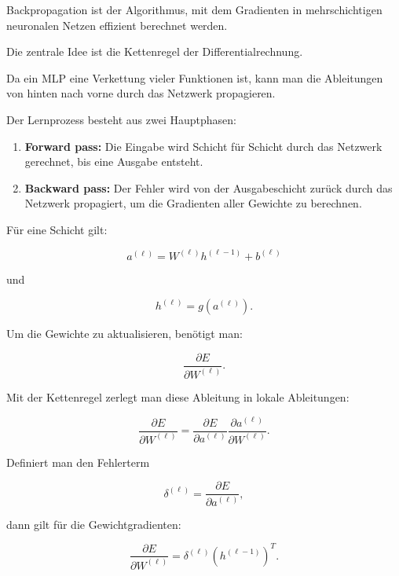 \documentclass[11pt,a4paper]{scrartcl}
\begin{document}
\begin{notebox}
    Backpropagation ist der Algorithmus, mit dem Gradienten in mehrschichtigen
    neuronalen Netzen effizient berechnet werden.

    Die zentrale Idee ist die Kettenregel der Differentialrechnung.

    Da ein MLP eine Verkettung vieler Funktionen ist, kann man die Ableitungen
    von hinten nach vorne durch das Netzwerk propagieren.
\end{notebox}

\begin{solutionbox}
    Der Lernprozess besteht aus zwei Hauptphasen:

    \begin{enumerate}
        \item \textbf{Forward pass:}
        Die Eingabe wird Schicht für Schicht durch das Netzwerk gerechnet, bis
        eine Ausgabe entsteht.

        \item \textbf{Backward pass:}
        Der Fehler wird von der Ausgabeschicht zurück durch das Netzwerk
        propagiert, um die Gradienten aller Gewichte zu berechnen.
    \end{enumerate}
\end{solutionbox}

\begin{calculationbox}
    Für eine Schicht gilt:

    \[
        a^{(\ell)}
        =
        W^{(\ell)}h^{(\ell-1)} + b^{(\ell)}
    \]

    und

    \[
        h^{(\ell)}
        =
        g(a^{(\ell)}).
    \]

    Um die Gewichte zu aktualisieren, benötigt man:

    \[
        \frac{\partial E}{\partial W^{(\ell)}}.
    \]

    Mit der Kettenregel zerlegt man diese Ableitung in lokale Ableitungen:

    \[
        \frac{\partial E}{\partial W^{(\ell)}}
        =
        \frac{\partial E}{\partial a^{(\ell)}}
        \frac{\partial a^{(\ell)}}{\partial W^{(\ell)}}.
    \]

    Definiert man den Fehlerterm

    \[
        \delta^{(\ell)}
        =
        \frac{\partial E}{\partial a^{(\ell)}},
    \]

    dann gilt für die Gewichtgradienten:

    \[
        \frac{\partial E}{\partial W^{(\ell)}}
        =
        \delta^{(\ell)}
        \left(h^{(\ell-1)}\right)^T.
    \]
\end{calculationbox}
\end{document}
